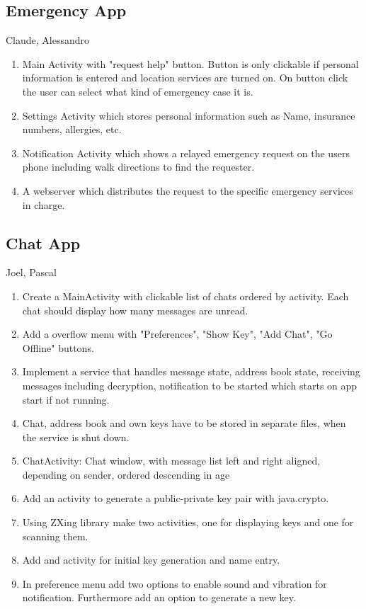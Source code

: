 		
\subsection{Emergency App}
	Claude, Alessandro
	\begin{enumerate}
		\item Main Activity with "request help" button. Button is only clickable if personal information is entered and location services are turned on. On button click the user can select what kind of emergency case it is.
		\item Settings Activity which stores personal information such as Name, insurance numbers, allergies, etc.
		\item Notification Activity which shows a relayed emergency request on the users phone including walk directions to find the requester.
		\item A webserver which distributes the request to the specific emergency services in charge.
	\end{enumerate}
		
\subsection{Chat App}
	Joel, Pascal
	\begin{enumerate}
		\item Create a MainActivity with clickable list of chats ordered by activity. Each chat should display how many messages are unread.
		\item Add a overflow menu with "Preferences", "Show Key", "Add Chat", "Go Offline" buttons.
		\item Implement a service that handles message state, address book state, receiving messages including decryption, notification to be started which starts on app start if not running.
		\item Chat, address book and own keys have to be stored in separate files, when the service is shut down.
		\item ChatActivity: Chat window, with message list left and right aligned, depending on sender, ordered descending in age
		\item Add an activity to generate a public-private key pair with java.crypto.
		\item Using ZXing library make two activities, one for displaying keys and one for scanning them.
		\item Add and activity for initial key generation and name entry.
		\item In preference menu add two options to enable sound and vibration for notification. Furthermore add an option to generate a new key.
	\end{enumerate}
			